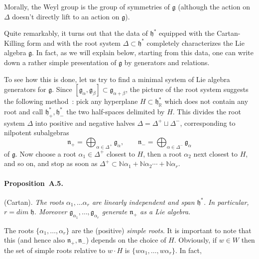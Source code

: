\documentclass[a4paper,10pt]{amsart}
\def\N{\mathbb{N}}
\def\a{\alpha}
\def\g{\mathfrak{g}}
\def\h{\mathfrak{h}}
\def\n{\mathfrak{n}}
\numberwithin{equation}{section}
\begin{document}
{\vspace{.1in}

Morally, the Weyl group is the group of symmetries of $\g$ (although the action on $\Delta$ doesn't directly lift to an action on $\g$).

\vspace{.1in}

Quite remarkably, it turns out that the data of $\h^*$ equipped with the Cartan-Killing form and with the root system $\Delta \subset \h^*$ completely characterizes the Lie algebra $\g$. In fact, as we will explain below, starting from this data, one can write down a rather simple presentation of $\g$ by generators and relations.

\vspace{.1in}

To see how this is done, let us try to find a minimal system of Lie algebra generators for $\g$. Since $[\g_{\a},\g_{\beta}] \subset \g_{\a+\beta}$, the picture of the root system suggests the following method~: pick any hyperplane $H \subset \h^*_{\mathbb{R}}$ which does not contain any root and call $\h^*_+, \h^*_{-}$ the two half-spaces delimited by $H$. This divides the root system $\Delta$ into positive and negative halves $\Delta =\Delta^+ \sqcup \Delta^-$, corresponding to nilpotent subalgebras
$$\n_+ =\bigoplus_{\a \in \Delta^+} \g_{\a}, \qquad \n_-=\bigoplus_{\a \in \Delta^-} \g_{\a}$$
of $\g$.  Now choose a root $\alpha_1 \in \Delta^+$ closest to $H$, then a root $\alpha_2$ next closest to $H$, and so on, and stop as soon as $\Delta^+ \subset \N\a_1 + \N \a_2 \cdots + \N \a_r$.

\vspace{.1in}

\paragraph{\textbf{Proposition~A.5.}}(Cartan).  \textit{The roots $\a_1, \ldots \a_r$ are linearly independent and span $\h^*$. In particular, $r={dim}\; \h$. Moreover $\g_{\a_1}, \ldots, \g_{\a_r}$ generate $\n_+$ as a Lie algebra.}

\vspace{.1in}

The roots $\{\a_1, \ldots, \a_r\}$ are the (positive) \textit{simple roots}. It is important to note that this (and hence also $\n_{+}, \n_-$) depends on the choice of $H$. Obviously, if $w \in W$ then the set of simple roots relative to $w \cdot H$ is $\{w \a_1, \ldots , w \a_r\}$. In fact,

}
\end{document}
